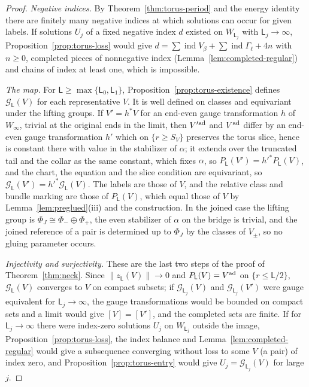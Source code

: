 \documentclass[11pt]{amsart}
\theoremstyle{definition}
\theoremstyle{remark}
\theoremstyle{plain}
\numberwithin{equation}{section}
\newcommand{\ind}{\operatorname{ind}}
\begin{document}
\begin{proof}
\emph{Negative indices.} By Theorem~\ref{thm:torus-period} and the energy identity
there are finitely many negative indices at which solutions can occur for given
labels. If solutions $U_j$ of a fixed negative index $d$ existed on $W_{\mathsf L_j}$ with
$\mathsf L_j\to\infty$, Proposition~\ref{prop:torus-loss} would give
$d=\sum\ind V_\beta+\sum\ind \Gamma_\ell+4n$ with $n\ge0$, completed pieces of nonnegative index
(Lemma~\ref{lem:completed-regular}) and chains of index at least one, which is
impossible.

\emph{The map.} For $\mathsf L\ge\max\{\mathsf L_0,\mathsf L_1\}$, Proposition~\ref{prop:torus-existence}
defines $\mathcal G_{\mathsf L}(V)$ for each representative $V$. It is well defined on classes
and equivariant under the lifting groups. If $V'=h^*V$ for an end-even gauge transformation $h$ of $W_\infty$, trivial at the original ends in the limit, then $V'^{\rm ad}$ and $V^{\rm ad}$ differ by an end-even gauge transformation $h'$ which on $\{r\ge S_V\}$ preserves the torus slice, hence is
constant there with value in the stabilizer of $\alpha$; it extends over the
truncated tail and the collar as the same constant, which fixes $\alpha$, so
$P_{\mathsf L}(V')=h'^*P_{\mathsf L}(V)$, and the chart, the equation and the slice condition are
equivariant, so $\mathcal G_{\mathsf L}(V')=h'^*\mathcal G_{\mathsf L}(V)$. The labels are those of $V$, and
the relative class and bundle marking are those of $P_{\mathsf L}(V)$, which equal those of
$V$ by Lemma~\ref{lem:preglued}(iii) and the construction. In the joined case the
lifting group is $\Phi_J\cong\Phi_-\oplus\Phi_+$, the even stabilizer of $\alpha$ on the bridge is
trivial, and the joined reference of a pair is determined up to $\Phi_J$ by the
classes of $V_\pm$, so no gluing parameter occurs.

\emph{Injectivity and surjectivity.} These are the last two steps of the proof of
Theorem~\ref{thm:neck}. Since $\|z_{\mathsf L}(V)\|\to0$ and $P_\mathsf L(V)=V^{\rm ad}$ on
$\{r\le\mathsf L/2\}$, $\mathcal G_{\mathsf L}(V)$ converges to $V$ on compact subsets; if
$\mathcal G_{\mathsf L_j}(V)$ and $\mathcal G_{\mathsf L_j}(V')$ were gauge equivalent for
$\mathsf L_j\to\infty$, the gauge transformations would be bounded on compact sets and a limit
would give $[V]=[V']$, and the completed sets are finite. If for $\mathsf L_j\to\infty$ there were
index-zero solutions $U_j$ on $W_{\mathsf L_j}$ outside the image, Proposition~\ref{prop:torus-loss},
the index balance and Lemma~\ref{lem:completed-regular} would give a subsequence converging
without loss to some $V$ (a pair) of index zero, and Proposition~\ref{prop:torus-entry} would give
$U_j=\mathcal G_{\mathsf L_j}(V)$ for large $j$.


\end{proof}
\end{document}
